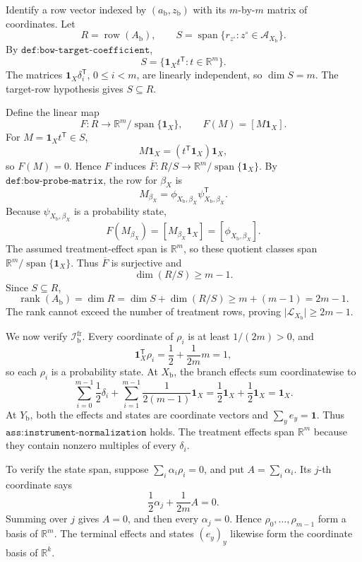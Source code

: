 Identify a row vector indexed by \((a_{\mathrm b},z_{\mathrm b})\) with its \(m\)-by-\(m\) matrix of coordinates.  Let
\[
R=\operatorname{row}(A_{\mathrm b}),
\qquad
S=\operatorname{span}\{r_{z^{\circ}}:z^{\circ}\in\mathcal A_{X_{\mathrm b}}\}.
\]
By \(\texttt{def:bow-target-coefficient}\),
\[
S=\{\mathbf 1_Xt^{\mathsf T}:t\in\mathbb R^m\}.
\]
The matrices \(\mathbf 1_X\delta_i^{\mathsf T}\), \(0\leq i<m\), are linearly independent, so \(\dim S=m\).  The target-row hypothesis gives \(S\subseteq R\).

Define the linear map
\[
F:R\longrightarrow\mathbb R^m/\operatorname{span}\{\mathbf 1_X\},
\qquad
F(M)=[M\mathbf 1_X].
\]
For \(M=\mathbf 1_Xt^{\mathsf T}\in S\),
\[
M\mathbf 1_X=(t^{\mathsf T}\mathbf 1_X)\mathbf 1_X,
\]
so \(F(M)=0\).  Hence \(F\) induces \(\overline F:R/S\to\mathbb R^m/\operatorname{span}\{\mathbf 1_X\}\).  By \(\texttt{def:bow-probe-matrix}\), the row for \(\beta_X\) is
\[
M_{\beta_X}=\phi_{X_{\mathrm b},\beta_X}\psi_{X_{\mathrm b},\beta_X}^{\mathsf T}.
\]
Because \(\psi_{X_{\mathrm b},\beta_X}\) is a probability state,
\[
F(M_{\beta_X})=[M_{\beta_X}\mathbf 1_X]=[\phi_{X_{\mathrm b},\beta_X}].
\]
The assumed treatment-effect span is \(\mathbb R^m\), so these quotient classes span \(\mathbb R^m/\operatorname{span}\{\mathbf 1_X\}\).  Thus \(\overline F\) is surjective and
\[
\dim(R/S)\geq m-1.
\]
Since \(S\subseteq R\),
\[
\operatorname{rank}(A_{\mathrm b})=\dim R
=\dim S+\dim(R/S)
\geq m+(m-1)=2m-1.
\]
The rank cannot exceed the number of treatment rows, proving \(\lvert\mathcal L_{X_{\mathrm b}}\rvert\geq2m-1\).

We now verify \(\mathcal I_{\mathrm b}^{\mathrm{fr}}\).  Every coordinate of \(\rho_i\) is at least \(1/(2m)>0\), and
\[
\mathbf 1_X^{\mathsf T}\rho_i=\frac12+\frac1{2m}m=1,
\]
so each \(\rho_i\) is a probability state.  At \(X_{\mathrm b}\), the branch effects sum coordinatewise to
\[
\sum_{i=0}^{m-1}\frac12\delta_i
+\sum_{i=1}^{m-1}\frac1{2(m-1)}\mathbf 1_X
=\frac12\mathbf 1_X+\frac12\mathbf 1_X
=\mathbf 1_X.
\]
At \(Y_{\mathrm b}\), both the effects and states are coordinate vectors and \(\sum_y e_y=\mathbf 1\).  Thus \(\texttt{ass:instrument-normalization}\) holds.  The treatment effects span \(\mathbb R^m\) because they contain nonzero multiples of every \(\delta_i\).

To verify the state span, suppose \(\sum_i\alpha_i\rho_i=0\), and put \(A=\sum_i\alpha_i\).  Its \(j\)-th coordinate says
\[
\frac12\alpha_j+\frac1{2m}A=0.
\]
Summing over \(j\) gives \(A=0\), and then every \(\alpha_j=0\).  Hence \(\rho_0,\ldots,\rho_{m-1}\) form a basis of \(\mathbb R^m\).  The terminal effects and states \((e_y)_y\) likewise form the coordinate basis of \(\mathbb R^k\).

